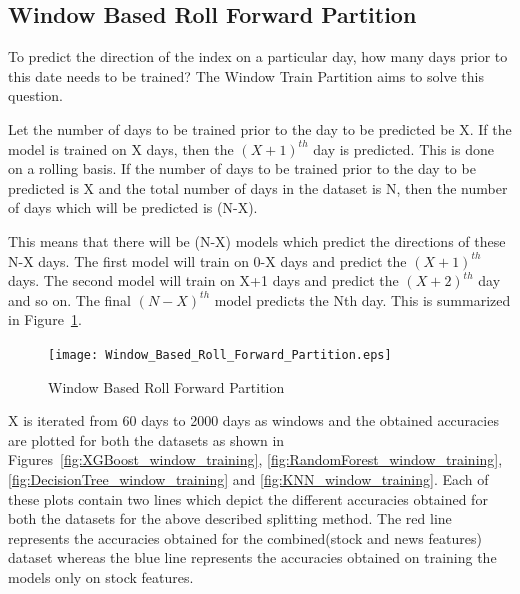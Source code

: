 \documentclass[preprint,12pt]{elsarticle}
\begin{document}
\subsection{Window Based Roll Forward Partition}


To predict the direction of the index on a particular day, how many days prior to this date needs to be trained? The Window Train Partition aims to solve this question.

Let the number of days to be trained prior to the day to be predicted be X. If the model is trained on X days, then the ${(X+1)^{th}}$ day is predicted. This is done on a rolling basis.
If the number of days to be trained prior to the day to be predicted is X and the total number of days in the dataset is N, then the number of days which will be predicted is (N-X).

This means that there will be (N-X) models which predict the directions of these N-X days. The first model will train on 0-X days and predict the ${(X+1)^{th}}$  days. The second model will train on X+1 days and predict the ${(X+2)^{th}}$  day and so on. The final ${(N - X)^{th}}$  model predicts the Nth day. This is summarized in Figure~\ref{fig:window_based_roll_forward_partition}.

\begin{figure}[H]
\centering
\texttt{[image: Window\_Based\_Roll\_Forward\_Partition.eps]}
\caption{\label{fig:window_based_roll_forward_partition} Window Based Roll Forward Partition}
\end{figure}

X is iterated from 60 days to 2000 days as windows and the obtained accuracies are plotted for both the datasets as shown in Figures~\ref{fig:XGBoost_window_training}, \ref{fig:RandomForest_window_training}, \ref{fig:DecisionTree_window_training} and  \ref{fig:KNN_window_training}. Each of these plots contain two lines which depict the different accuracies obtained for both the datasets for the above described splitting method. The red line represents the accuracies obtained for the combined(stock and news features) dataset whereas the blue line represents the accuracies obtained on training the models only on stock features.
\end{document}
